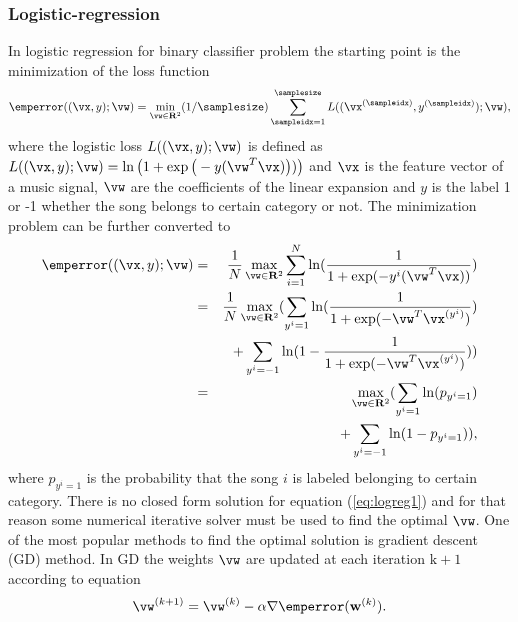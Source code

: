 \documentclass[aps,prb,10pt,twocolumn,groupedaddress]{revtex4-1}
\begin{document}
\subsubsection{Logistic-regression}
\label{sec:gradient_descent}
In logistic regression for binary classifier problem the starting point is the
minimization of the loss function
\vspace*{-2mm}
 $$\emperror((\vx,y);\vw) =\min\limits_{\vw \in \mathbf{R}^{2}} (1/\samplesize)\sum_{\sampleidx=1}^{\samplesize} L((\vx^{(\sampleidx)},y^{(\sampleidx)}); \vw),$$
where the logistic loss $L((\vx,y); \vw)$ is defined as   $L((\vx,y); \vw) = \ln\big(1 + \exp\big(- y (\vw^{T} \vx)\big))\big)$ and
$\vx$ is the feature vector of a music signal, $\vw$ are the coefficients of the linear expansion and $y$ is the label 1 or -1 whether the
song belongs to certain category or not. The minimization problem can be further converted to
\begin{eqnarray}
  \emperror((\vx,y);\vw)&=&\frac{1}{N}\max\limits_{\vw \in \mathbf{R}^{2}}\sum_{i=1}^{N}\mathrm{ln}(\frac{1}{1+\mathrm{exp}(-y^i(\vw^T\vx))})\nonumber\\
  &=&\frac{1}{N}\max\limits_{\vw \in \mathbf{R}^{2}}(\sum_{y^i=1}\mathrm{ln}(\frac{1}{1+\mathrm{exp}(-\vw^T\vx^{(y^i)})})\nonumber\\
  & & + \sum_{y^i=-1}\mathrm{ln}(1-\frac{1}{1 + \mathrm{exp}(-\vw^T\vx^{(y^i)})}))\\
  &=&\max\limits_{\vw \in \mathbf{R}^{2}}(\sum_{y^i=1}\mathrm{ln}(p_{y^i=1})\nonumber\\
  & & + \sum_{y^i=-1}\mathrm{ln}(1-p_{y^i=1})),
  \label{eq:logreg1}
\end{eqnarray}
where $p_{y^i=1}$ is the probability that the song $i$ is labeled belonging to certain category.
There is no closed form solution for equation (\ref{eq:logreg1}) and for that reason some numerical iterative solver must
be used to find the optimal $\vw$. One of the most popular methods to find the optimal solution is gradient descent (GD) method.
In GD the weights $\vw$ are updated at each iteration $\mathrm{k+1}$ according to equation
\begin{equation}
  \vw^{(k+1)} = \vw^{(k)} - \alpha \nabla \emperror(\mathbf{w}^{(k)}).
  \label{eq:gd}
\end{equation}
\end{document}
